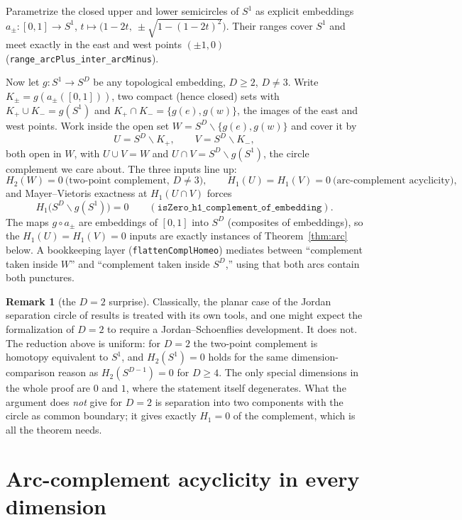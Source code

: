 \documentclass[11pt]{article}
\theoremstyle{definition}
\newtheorem{remark}[theorem]{Remark}
\newcommand{\Sph}[1]{S^{#1}}
\newcommand{\lean}[1]{\texttt{#1}}
\begin{document}
Parametrize the closed upper and lower semicircles of $S^1$ as explicit embeddings $a_\pm \colon [0,1] \to S^1$, $t \mapsto \bigl(1 - 2t,\ \pm\sqrt{1 - (1-2t)^2}\bigr)$. Their ranges cover $S^1$ and meet exactly in the east and west points $(\pm 1, 0)$ (\lean{range\_arcPlus\_inter\_arcMinus}).

Now let $g \colon S^1 \to \Sph{D}$ be any topological embedding, $D \geq 2$, $D \neq 3$. Write $K_\pm = g(a_\pm([0,1]))$, two compact (hence closed) sets with $K_+ \cup K_- = g(S^1)$ and $K_+ \cap K_- = \{g(e), g(w)\}$, the images of the east and west points. Work inside the open set $W = \Sph{D} \smallsetminus \{g(e), g(w)\}$ and cover it by
\[
U = \Sph{D} \smallsetminus K_+ , \qquad V = \Sph{D} \smallsetminus K_- ,
\]
both open in $W$, with $U \cup V = W$ and $U \cap V = \Sph{D} \smallsetminus g(S^1)$, the circle complement we care about. The three inputs line up:
\[
H_2(W) = 0 \ \text{(two-point complement, $D \neq 3$)}, \qquad
H_1(U) = H_1(V) = 0 \ \text{(arc-complement acyclicity)},
\]
and Mayer--Vietoris exactness at $H_1(U \cap V)$ forces
\[
H_1\bigl(\Sph{D} \smallsetminus g(S^1)\bigr) = 0
\qquad (\lean{isZero\_h1\_complement\_of\_embedding}).
\]
The maps $g \circ a_\pm$ are embeddings of $[0,1]$ into $\Sph{D}$ (composites of embeddings), so the $H_1(U) = H_1(V) = 0$ inputs are exactly instances of Theorem~\ref{thm:arc} below. A bookkeeping layer (\lean{flattenComplHomeo}) mediates between ``complement taken inside $W$'' and ``complement taken inside $\Sph{D}$,'' using that both arcs contain both punctures.

\begin{remark}[the $D = 2$ surprise]
Classically, the planar case of the Jordan separation circle of results is treated with its own tools, and one might expect the formalization of $D = 2$ to require a Jordan--Schoenflies development. It does not. The reduction above is uniform: for $D = 2$ the two-point complement is homotopy equivalent to $\Sph{1}$, and $H_2(\Sph{1}) = 0$ holds for the same dimension-comparison reason as $H_2(\Sph{D-1}) = 0$ for $D \geq 4$. The only special dimensions in the whole proof are $0$ and $1$, where the statement itself degenerates. What the argument does \emph{not} give for $D=2$ is separation into two components with the circle as common boundary; it gives exactly $H_1 = 0$ of the complement, which is all the theorem needs.
\end{remark}

\section{Arc-complement acyclicity in every dimension}
\label{sec:arc}
\end{document}

